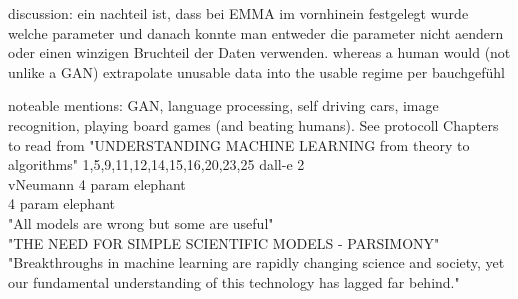  discussion: ein nachteil ist, dass bei EMMA im vornhinein festgelegt wurde welche parameter und danach konnte man entweder die parameter nicht aendern oder einen winzigen Bruchteil der Daten verwenden. whereas a human would (not unlike a GAN) extrapolate unusable data into the usable regime per bauchgefühl


noteable mentions: GAN, language processing, self driving cars, image recognition, playing board games (and beating humans). 
See protocoll
Chapters to read from "UNDERSTANDING MACHINE LEARNING from theory to algorithms" 1,5,9,11,12,14,15,16,20,23,25
dall-e 2 \cite{Marcus2022}\\
vNeumann 4 param elephant \cite{Dyson2004}\\
4 param elephant \cite{Mayer2010}\\
"All models are wrong but some are useful" \cite{Box1979}\\
"THE NEED FOR SIMPLE SCIENTIFIC MODELS - PARSIMONY" \cite{Box1979}\\
"Breakthroughs in machine learning are rapidly changing science and society, yet our fundamental understanding of this technology has lagged far behind." \cite{Belkin2018}\\
\fi
